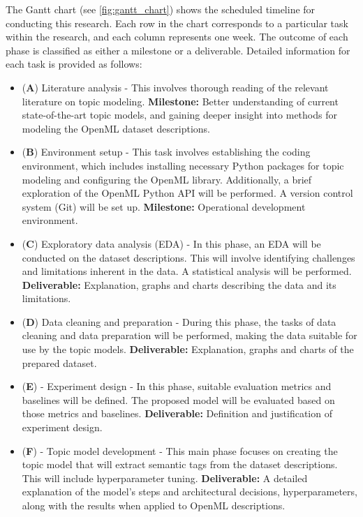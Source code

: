\documentclass{article}
\begin{document}
The Gantt chart (see \cref{fig:gantt_chart}) shows the scheduled timeline for conducting this research. Each row in the chart corresponds to a particular task within the research, and each column represents one week. The outcome of each phase is classified as either a milestone or a deliverable. Detailed information for each task is provided as follows:

\begin{itemize}
    \item (\textbf{A}) Literature analysis - This involves thorough reading of the relevant literature on topic modeling. \textbf{Milestone:} Better understanding of current state-of-the-art topic models, and gaining deeper insight into methods for modeling the OpenML dataset descriptions.

    \item (\textbf{B}) Environment setup - This task involves establishing the coding environment, which includes installing necessary Python packages for topic modeling and configuring the OpenML library. Additionally, a brief exploration of the OpenML Python API will be performed. A version control system (Git) will be set up. \textbf{Milestone:} Operational development environment.

    \item (\textbf{C}) Exploratory data analysis (EDA) - In this phase, an EDA will be conducted on the dataset descriptions. This will involve identifying challenges and limitations inherent in the data. A statistical analysis will be performed. \textbf{Deliverable:} Explanation, graphs and charts describing the data and its limitations.

    \item (\textbf{D}) Data cleaning and preparation - During this phase, the tasks of data cleaning and data preparation will be performed, making the data suitable for use by the topic models. \textbf{Deliverable:} Explanation, graphs and charts of the prepared dataset.

    \item (\textbf{E}) - Experiment design - In this phase, suitable evaluation metrics and baselines will be defined. The proposed model will be evaluated based on those metrics and baselines. \textbf{Deliverable:} Definition and justification of experiment design.

    \item (\textbf{F}) - Topic model development - This main phase focuses on creating the topic model that will extract semantic tags from the dataset descriptions. This will include hyperparameter tuning. \textbf{Deliverable:} A detailed explanation of the model's steps and architectural decisions, hyperparameters, along with the results when applied to OpenML descriptions.


\end{itemize}
\end{document}

